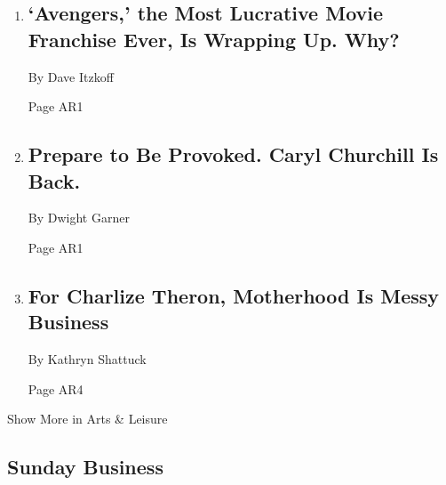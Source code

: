 \begin{enumerate}
\def\labelenumi{\arabic{enumi}.}
\item
  \href{/2018/04/23/movies/avengers-infinity-war-disney-marvel.html}{}

  \hypertarget{avengers-the-most-lucrative-movie-franchise-ever-is-wrapping-up-why}{%
  \subsection{`Avengers,' the Most Lucrative Movie Franchise Ever, Is
  Wrapping Up.
  Why?}\label{avengers-the-most-lucrative-movie-franchise-ever-is-wrapping-up-why}}

  By Dave Itzkoff

  Page AR1
\item
  \href{/2018/04/25/theater/caryl-churchill-playwright-light-shining-in-buckinghamshire.html}{}

  \hypertarget{prepare-to-be-provoked-caryl-churchill-is-back}{%
  \subsection{Prepare to Be Provoked. Caryl Churchill Is
  Back.}\label{prepare-to-be-provoked-caryl-churchill-is-back}}

  By Dwight Garner

  Page AR1
\item
  \href{/2018/04/27/movies/for-charlize-theron-motherhood-is-messy-business.html}{}

  \hypertarget{for-charlize-theron-motherhood-is-messy-business}{%
  \subsection{For Charlize Theron, Motherhood Is Messy
  Business}\label{for-charlize-theron-motherhood-is-messy-business}}

  By Kathryn Shattuck

  Page AR4
\end{enumerate}

Show More in Arts \& Leisure

\hypertarget{sunday-business}{%
\subsection{Sunday Business}\label{sunday-business}}

